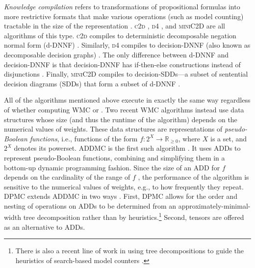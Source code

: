 \emph{Knowledge compilation} refers to transformations of propositional formulas
into more restrictive formats that make various operations (such as model
counting) tractable in the size of the representation
\citep{DBLP:journals/jair/DarwicheM02}.
\textsc{c2d} \citep{DBLP:conf/ecai/Darwiche04},
\textsc{d4} \citep{DBLP:conf/ijcai/LagniezM17}, and
\textsc{miniC2D} \citep{DBLP:conf/ijcai/OztokD15}
are all algorithms of this type. \textsc{c2d} compiles to deterministic
decomposable negation normal form
(d-DNNF) \citep{DBLP:journals/jancl/Darwiche01}. Similarly, \textsc{d4} compiles
to decision-DNNF (also known as decomposable decision
graphs) \citep{DBLP:conf/aaai/FargierM06}. The only difference between d-DNNF and
decision-DNNF is that decision-DNNF has if-then-else constructions instead of
disjunctions \citep{DBLP:conf/ijcai/LagniezM17}. Finally,
\textsc{miniC2D} compiles to decision-SDDs---a
subset of sentential decision diagrams (SDDs) that form a subset of
d-DNNF \citep{DBLP:conf/ijcai/Darwiche11}.

All of the algorithms mentioned above execute in exactly the same way regardless
of whether computing WMC or \mc{}. Two recent WMC algorithms instead use data
structures whose size (and thus the runtime of the algorithm) depends on the
numerical values of weights. These data structures are representations of
\emph{pseudo-Boolean functions}, i.e., functions of the form
$f\colon 2^X \to \mathbb{R}_{\ge 0}$, where $X$ is a set, and $2^X$ denotes its
powerset. \textsc{ADDMC} is the first such algorithm
\citep{DBLP:conf/aaai/DudekPV20}. It uses ADDs to represent pseudo-Boolean
functions, combining and simplifying them in a bottom-up dynamic programming
fashion. Since the size of an ADD for $f$ depends on the cardinality of the
range of $f$ \citep{DBLP:journals/fmsd/BaharFGHMPS97}, the performance of the
algorithm is sensitive to the numerical values of weights, e.g., to how
frequently they repeat. \textsc{DPMC} extends \textsc{ADDMC} in two ways
\citep{DBLP:conf/cp/DudekPV20}. First, \textsc{DPMC} allows for the order and
nesting of operations on ADDs to be determined from an
approximately-minimal-width tree decomposition rather than by
heuristics.\footnote{There is also a recent line of work in using tree
  decompositions to guide the heuristics of search-based model counters
  \citep{DBLP:conf/cp/KorhonenJ21}.} Second, tensors are offered as an
alternative to ADDs.

